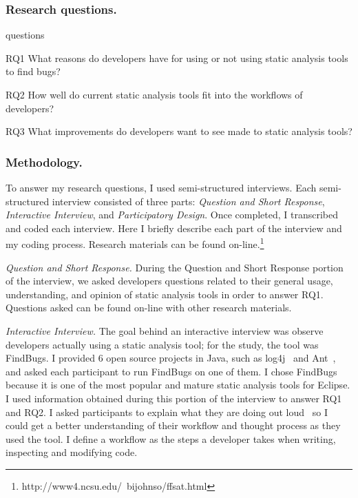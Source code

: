 \documentclass{llncs}
\begin{document}
\subsubsection{Research questions.}
\begin{labeling}{questions}
	\item [RQ1] What reasons do developers have for using or not using static analysis tools to find bugs?
	\item [RQ2] How well do current static analysis tools fit into the workflows of developers? 
	\item [RQ3] What improvements do developers want to see made to static analysis tools?
\end{labeling}

\subsubsection{Methodology.}
To answer my research questions, I used semi-structured interviews. Each semi-structured interview consisted of three parts: \textit{Question and  Short Response}, \textit{Interactive Interview}, and \textit{Participatory Design}. Once completed, I transcribed and coded each interview. Here I briefly describe each part of the interview and my coding process.
Research materials can be found on-line.\footnote{http://www4.ncsu.edu/~bijohnso/ffsat.html}

\vspace{0.5em}
\noindent\textit{Question and Short Response.} During the Question and Short Response portion of the interview, we asked developers questions related to their general usage, understanding, and opinion of static analysis tools in order to answer RQ1. Questions asked can be found on-line with other research materials.

\vspace{0.5em}
\noindent\textit{Interactive Interview.}
The goal behind an interactive interview was observe developers actually using a static analysis tool; for the study, the tool was FindBugs. I provided 6 open source projects in Java, such as log4j~\cite{log4j} and Ant~\cite{ANT}, and asked each participant to run FindBugs on one of them. I chose FindBugs because it is one of the most popular and mature static analysis tools for Eclipse. I used information obtained during this portion of the interview to answer RQ1 and RQ2. I asked participants to explain what they are doing out loud~\cite{Lewis:1982:ThinkAloudProtocol} so I could get a better understanding of their workflow and thought process as they used the tool. I define a workflow as the steps a developer takes when writing, inspecting and modifying code.
\end{document}
